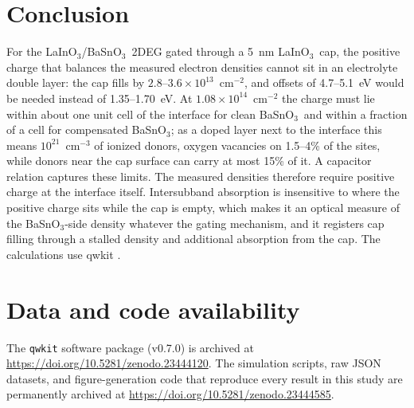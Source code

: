 \documentclass[11pt]{article}
\newcommand{\LIO}{\texorpdfstring{LaInO$_3$}{LaInO3}}
\newcommand{\BSO}{\texorpdfstring{BaSnO$_3$}{BaSnO3}}
\begin{document}
\section{Conclusion}
For the \LIO/\BSO\ 2DEG gated through a 5~nm \LIO\ cap, the positive charge that balances the measured electron densities cannot sit in an electrolyte double layer: the cap fills by $2.8$--$3.6\times10^{13}$~cm$^{-2}$, and offsets of 4.7--5.1~eV would be needed instead of 1.35--1.70~eV. At $1.08\times10^{14}$~cm$^{-2}$ the charge must lie within about one unit cell of the interface for clean \BSO\ and within a fraction of a cell for compensated \BSO; as a doped layer next to the interface this means $10^{21}$~cm$^{-3}$ of ionized donors, oxygen vacancies on 1.5--4\% of the sites, while donors near the cap surface can carry at most 15\% of it. A capacitor relation captures these limits. The measured densities therefore require positive charge at the interface itself. Intersubband absorption is insensitive to where the positive charge sits while the cap is empty, which makes it an optical measure of the \BSO-side density whatever the gating mechanism, and it registers cap filling through a stalled density and additional absorption from the cap. The calculations use qwkit \cite{qwkit}.

\section*{Data and code availability}
The \texttt{qwkit} software package (v0.7.0) is archived at \url{https://doi.org/10.5281/zenodo.23444120}. The simulation scripts, raw JSON datasets, and figure-generation code that reproduce every result in this study are permanently archived at \url{https://doi.org/10.5281/zenodo.23444585}.



\end{document}
